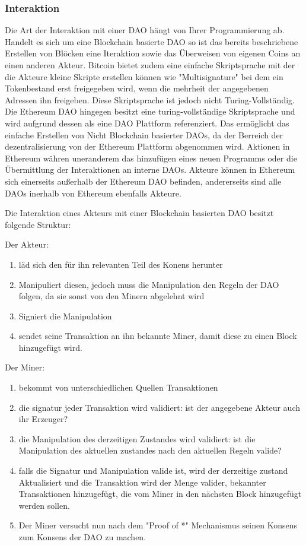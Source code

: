 \documentclass[a4paper,12pt]{article}
\begin{document}
\subsubsection*{Interaktion}
Die Art der Interaktion mit einer DAO hängt von Ihrer Programmierung ab. Handelt es sich um eine Blockchain basierte DAO so ist das bereits beschriebene Erstellen von Blöcken eine Iteraktion sowie das Überweisen von eigenen Coins an einen anderen Akteur. Bitcoin bietet zudem eine einfache Skriptsprache mit der die Akteure kleine Skripte erstellen können wie "Multisignature" bei dem ein Tokenbestand erst freigegeben wird, wenn die mehrheit der angegebenen Adressen ihn freigeben. Diese Skriptsprache ist jedoch nicht Turing-Vollständig. Die Ethereum DAO hingegen besitzt eine turing-vollständige Skriptsprache und wird aufgrund dessen als eine DAO Plattform referenziert. Das ermöglicht das einfache Erstellen von Nicht Blockchain basierter DAOs, da der Berreich der dezentralisierung von der Ethereum Plattform abgenommen wird. Aktionen in Ethereum währen uneranderem das hinzufügen eines neuen Programms oder die Übermittlung der Interaktionen an interne DAOs. Akteure können in Ethereum sich einerseits außerhalb der Ethereum DAO befinden, andererseits sind alle DAOs inerhalb von Ethereum ebenfalls Akteure.

Die Interaktion eines Akteurs mit einer Blockchain basierten DAO besitzt folgende Struktur:

Der Akteur:
\begin{enumerate}
  \item läd sich den für ihn relevanten Teil des Konens herunter
  \item Manipuliert diesen, jedoch muss die Manipulation den Regeln der DAO folgen, da sie sonst von den Minern abgelehnt wird
  \item Signiert die Manipulation
  \item sendet seine Transaktion an ihn bekannte Miner, damit diese zu einen Block hinzugefügt wird.
\end{enumerate}

Der Miner:
\begin{enumerate}
  \item bekommt von unterschiedlichen Quellen Transaktionen
  \item die signatur jeder Transaktion wird validiert: ist der angegebene Akteur auch ihr Erzeuger?
  \item die Manipulation des derzeitigen Zustandes wird validiert: ist die Manipulation des aktuellen zustandes nach den aktuellen Regeln valide?
  \item falls die Signatur und Manipulation valide ist, wird der derzeitige zustand Aktualisiert und die Transaktion wird der Menge valider, bekannter Transaktionen hinzugefügt, die vom Miner in den nächsten Block hinzugefügt werden sollen.
  \item Der Miner versucht nun nach dem "Proof of *" Mechanismus seinen Konsens zum Konsens der DAO zu machen.
\end{enumerate}
\end{document}
